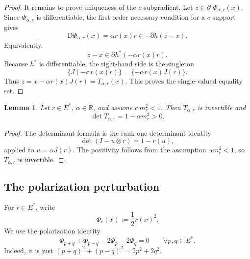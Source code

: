 \documentclass[10pt,a4paper]{amsart}
\numberwithin{equation}{section}
\newtheorem{lemma}[theorem]{Lemma}
\newcommand{\R}{\mathbb{R}}
\newcommand{\D}{\mathrm D}
\begin{document}
\begin{proof}
		It remains to prove uniqueness of the \(c\)-subgradient. Let
		\(z\in\partial^c\Phi_{\alpha,r}(x)\). Since \(\Phi_{\alpha,r}\) is differentiable,
		the first-order necessary condition for a \(c\)-support gives
		\[
		\D\Phi_{\alpha,r}(x)=\alpha r(x)r\in -\partial h(z-x).
		\]
		Equivalently,
		\[
		z-x\in \partial h^*(-\alpha r(x)r).
		\]
		Because \(h^*\) is differentiable, the right-hand side is the singleton
		\[
		\{J(-\alpha r(x)r)\}
		=\{-\alpha r(x)J(r)\}.
		\]
		Thus \(z=x-\alpha r(x)J(r)=T_{\alpha,r}(x)\). This proves the single-valued equality
		set.
	\end{proof}
	
	
	\begin{lemma}
		\label{lem:rank-one-extension}
		Let \(r\in E^*\), \(\alpha\in\R\), and assume \(\alpha m_r^2<1\). Then
		\(T_{\alpha,r}\) is invertible and
		\[
		\det T_{\alpha,r}=1-\alpha m_r^2>0.
		\]
	\end{lemma}
	
	\begin{proof}
		The determinant formula is the rank-one determinant identity
		\[
		\det(I-u\otimes r)=1-r(u),
		\]
		applied to \(u=\alpha J(r)\). The positivity follows from the assumption \(\alpha m_r^2<1\), so \(T_{\alpha,r}\) is invertible.
		
	\end{proof}
	
	\subsection{The polarization perturbation}\label{subsec:polarization-perturbation}
	
	For \(r\in E^*\), write
	\[
	\Phi_r(x):=\frac12 r(x)^2.
	\]
	We use the polarization identity
	\begin{equation}\label{eq:polarization-zero-sum}
		\Phi_{p+q}+\Phi_{p-q}-2\Phi_p-2\Phi_q=0
		\qquad\forall p,q\in E^*.
	\end{equation}
	Indeed, it is just
	\((p+q)^2+(p-q)^2=2p^2+2q^2\).
	
\end{document}
